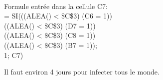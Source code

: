 \begin{enumerate}[label=\textbf{\color{red}\arabic*.}]
{\begin{center}
        \hfill
    \end{center}
        \item {}\\
        Formule entrée dans la cellule C7:\\
        = SI(((ALEA() < \$C\$3) \ET (C6 = 1))\\
        \OU ((ALEA() < \$C\$3) \ET (D7 = 1))\\
        \OU ((ALEA() < \$C\$3) \ET (C8 = 1))\\
        \OU ((ALEA() < \$C\$3) \ET (B7 = 1));\\
        1; C7)
        \item Il faut environ 4 jours pour infecter tous le monde.
    }


\end{enumerate}
